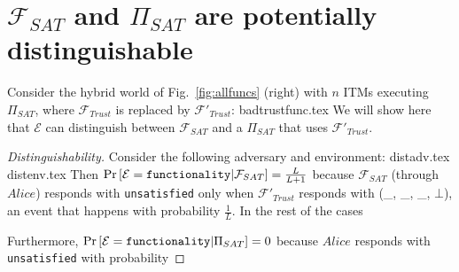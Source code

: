 \section{$\mathcal{F}_{SAT}$ and $\Pi_{SAT}$ are potentially distinguishable}
  Consider the hybrid world of Fig.~\ref{fig:allfuncs} (right) with $n$ ITMs executing
  $\Pi_{SAT}$, where $\mathcal{F}_{Trust}$ is replaced by $\mathcal{F}'_{Trust}$:
  {badtrustfunc.tex}
  We will show here that $\mathcal{E}$ can distinguish between $\mathcal{F}_{SAT}$ and a
  $\Pi_{SAT}$ that uses $\mathcal{F}'_{Trust}$.
  \begin{proof}[Distinguishability]
    Consider the following adversary and environment:
    {distadv.tex}
    {distenv.tex}
    Then $\Pr\left[\mathcal{E} = \mbox{\texttt{functionality}} | \mathcal{F}_{SAT}\right]
    = \frac{L}{L + 1}$ because $\mathcal{F}_{SAT}$ (through $Alice$) responds with
    \texttt{unsatisfied} only when $\mathcal{F}'_{Trust}$ responds with (\_, \_, \_,
    $\bot$), an event that happens with probability $\frac{1}{L}$. In the rest of the
    cases

    Furthermore, $\Pr\left[\mathcal{E} = \mbox{\texttt{functionality}} | \Pi_{SAT}\right]
    = 0$ because $Alice$ responds with \texttt{unsatisfied} with probability
  \end{proof}

